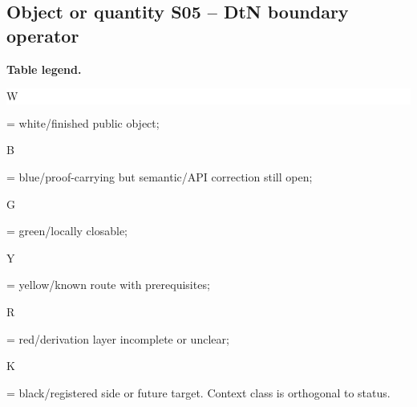 \subsection*{Object or quantity S05 -- DtN boundary operator}
\hypertarget{objproof:S05}{}
\par\smallskip\noindent\begin{minipage}{0.99\linewidth}\footnotesize\raggedright\textbf{Table legend.} \colorbox{white}{\strut W} = white/finished public object; \colorbox{cyan!20}{\strut B} = blue/proof-carrying but semantic/API correction still open; \colorbox{green!18}{\strut G} = green/locally closable; \colorbox{yellow!25}{\strut Y} = yellow/known route with prerequisites; \colorbox{red!20}{\strut R} = red/derivation layer incomplete or unclear; \colorbox{black!18}{\strut K} = black/registered side or future target. Context class is orthogonal to status.\end{minipage}\par\vspace{0.25em}
